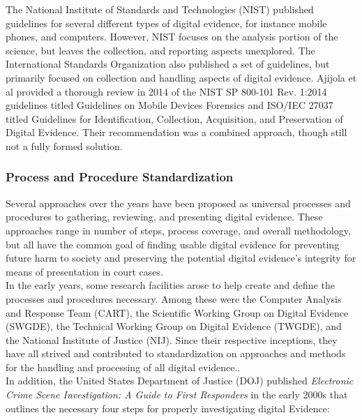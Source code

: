 \documentclass[12pt]{article}
\begin{document}
The National Institute of Standards and Technologies (NIST) published guidelines for several
different types of digital evidence, for instance mobile phones, and computers.
However, NIST focuses on the analysis portion of the science, but leaves the collection,
and reporting aspects unexplored.  The International Standards Organization also published
a set of guidelines, but primarily focused on collection and handling aspects of digital
evidence.  
Ajijola et al\cite{ajijola2014review} provided a thorough review in 2014 of the NIST SP
800-101 Rev. 1:2014 guidelines
titled Guidelines on Mobile Devices Forensics and ISO/IEC 27037 titled
Guidelines for
Identification, Collection, Acquisition, and Preservation of Digital Evidence.
Their recommendation was a combined approach, though still not a fully formed solution.\\

\subsubsection{Process and Procedure Standardization}

Several approaches over the years have been proposed as universal processes and procedures to
gathering, reviewing, and presenting digital evidence.  These approaches range in number of
steps, process coverage, and overall methodology, 
but all have the common goal of finding usable digital evidence for preventing future
harm to society and preserving the potential digital evidence's 
integrity for means of presentation in court cases.\\

In the early years, some research facilities arose to help create and define the processes
and procedures necessary.  Among these were the Computer Analysis and
Response Team (CART), the Scientific Working Group on Digital Evidence (SWGDE), the
Technical Working Group on Digital Evidence (TWGDE), and the National Institute of
Justice (NIJ).  Since their respective inceptions, they have all strived and 
contributed to standardization on approaches and methods for 
the handling and processing of all digital evidence.\cite{noblett2000recovering}.\\

In addition, the United States Department of Justice (DOJ) published 
{\em Electronic Crime Scene Investigation: A Guide to First Responders}
\cite{ballou2010electronic} in the early 2000s that outlines
the necessary four steps for properly investigating digital Evidence:
\end{document}
